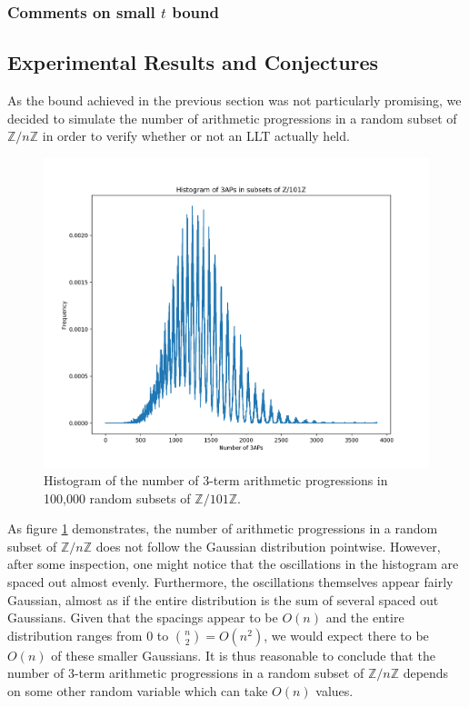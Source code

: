 \documentclass[12pt]{article} %
\newcommand{\Z}{\mathbb{Z}}
\theoremstyle{definition}
\theoremstyle{remark}
\begin{document}
\subsubsection{Comments on small $t$ bound}



\subsection{Experimental Results and Conjectures}

As the bound achieved in the previous section was not particularly promising, we decided to simulate the number of arithmetic progressions in a random subset of $\Z / n \Z$ in order to verify whether or not an LLT actually held.

\begin{figure}[h]
	\centering
	\includegraphics[scale=0.5]{3ap-hist}
    \caption{Histogram of the number of 3-term arithmetic progressions in 100,000 random subsets of $\Z / 101\Z$.}
    \label{fig:3ap}
\end{figure}

As figure \ref{fig:3ap} demonstrates, the number of arithmetic progressions in a random subset of $\Z / n \Z$ does not follow the Gaussian distribution pointwise. However, after some inspection, one might notice that the oscillations in the histogram are spaced out almost evenly. Furthermore, the oscillations themselves appear fairly Gaussian, almost as if the entire distribution is the sum of several spaced out Gaussians. Given that the spacings appear to be $O(n)$ and the entire distribution ranges from 0 to $\binom{n}{2} = O(n^2)$, we would expect there to be $O(n)$ of these smaller Gaussians. It is thus reasonable to conclude that the number of 3-term arithmetic progressions in a random subset of $\Z / n\Z$ depends on some other random variable which can take $O(n)$ values.
\end{document}
